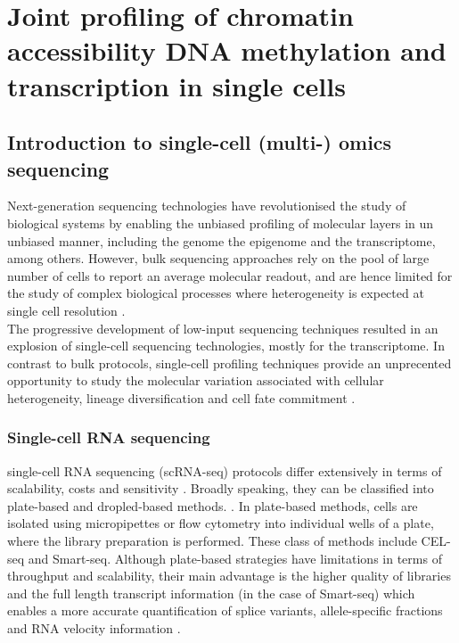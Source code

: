 \graphicspath{{Chapter1/Figs/}}

\chapter{Joint profiling of chromatin accessibility DNA methylation and transcription in single cells}

\section{Introduction to single-cell (multi-) omics sequencing}

Next-generation sequencing technologies have revolutionised the study of biological systems by enabling the unbiased profiling of molecular layers in un unbiased manner, including the genome\cite{Fleischmann1995} the epigenome\cite{Frommer1992} and the transcriptome\cite{Lister2008,Bainbridge2006,Nagalakshmi2008,Mortazavi2008}, among others. However, bulk sequencing approaches rely on the pool of large number of cells to report an average molecular readout, and are hence limited for the study of complex biological processes where heterogeneity is expected at single cell resolution \cite{Griffiths2018,Papalexi2017,Patel2014}.\\
The progressive development of low-input sequencing techniques resulted in an explosion of single-cell sequencing technologies, mostly for the transcriptome. In contrast to bulk protocols, single-cell profiling techniques provide an unprecented opportunity to study the molecular variation associated with cellular heterogeneity, lineage diversification and cell fate commitment \cite{Kolodziejczyk2015}.

\subsection{Single-cell RNA sequencing} \label{section:rna_expresssion}
single-cell RNA sequencing (scRNA-seq) protocols differ extensively in terms of scalability, costs and sensitivity \cite{Svensson2018, Lafzi2018}. Broadly speaking, they can be classified into plate-based and dropled-based methods. . In plate-based methods, cells are isolated using micropipettes or flow cytometry into individual wells of a plate, where the library preparation is performed. These class of methods include CEL-seq \cite{Hashimshony2012} and Smart-seq\cite{Ramskold2012, Picelli2014}. 
Although plate-based strategies have limitations in terms of throughput and scalability, their main advantage is the higher quality of libraries and the full length transcript information (in the case of Smart-seq) which enables a more accurate quantification of splice variants\cite{Huang2017}, allele-specific fractions\cite{Deng2014} and RNA velocity information \cite{LaManno2018}.
	
